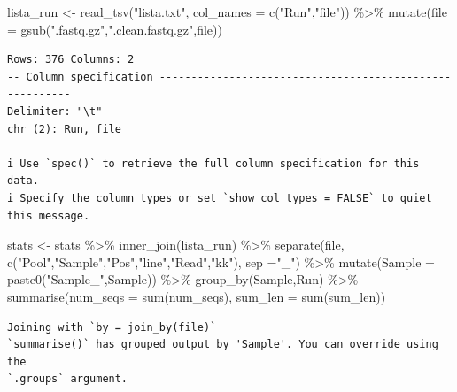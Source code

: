 \documentclass[
  letterpaper,
  DIV=11,
  numbers=noendperiod]{scrartcl}
\newenvironment{Shaded}{\begin{snugshade}}{\end{snugshade}}
\newcommand{\AttributeTok}[1]{\textcolor[rgb]{0.40,0.45,0.13}{#1}}
\newcommand{\FunctionTok}[1]{\textcolor[rgb]{0.28,0.35,0.67}{#1}}
\newcommand{\NormalTok}[1]{\textcolor[rgb]{0.00,0.23,0.31}{#1}}
\newcommand{\OtherTok}[1]{\textcolor[rgb]{0.00,0.23,0.31}{#1}}
\newcommand{\SpecialCharTok}[1]{\textcolor[rgb]{0.37,0.37,0.37}{#1}}
\newcommand{\StringTok}[1]{\textcolor[rgb]{0.13,0.47,0.30}{#1}}
\begin{document}
\begin{Shaded}
\begin{Highlighting}[]
\NormalTok{lista\_run }\OtherTok{\textless{}{-}} \FunctionTok{read\_tsv}\NormalTok{(}\StringTok{"lista.txt"}\NormalTok{, }\AttributeTok{col\_names =} \FunctionTok{c}\NormalTok{(}\StringTok{"Run"}\NormalTok{,}\StringTok{"file"}\NormalTok{)) }\SpecialCharTok{\%\textgreater{}\%} 
  \FunctionTok{mutate}\NormalTok{(}\AttributeTok{file =} \FunctionTok{gsub}\NormalTok{(}\StringTok{".fastq.gz"}\NormalTok{,}\StringTok{".clean.fastq.gz"}\NormalTok{,file))}
\end{Highlighting}
\end{Shaded}

\begin{verbatim}
Rows: 376 Columns: 2
-- Column specification --------------------------------------------------------
Delimiter: "\t"
chr (2): Run, file

i Use `spec()` to retrieve the full column specification for this data.
i Specify the column types or set `show_col_types = FALSE` to quiet this message.
\end{verbatim}

\begin{Shaded}
\begin{Highlighting}[]
\NormalTok{stats }\OtherTok{\textless{}{-}}\NormalTok{ stats }\SpecialCharTok{\%\textgreater{}\%} \FunctionTok{inner\_join}\NormalTok{(lista\_run) }\SpecialCharTok{\%\textgreater{}\%} 
  \FunctionTok{separate}\NormalTok{(file, }\FunctionTok{c}\NormalTok{(}\StringTok{"Pool"}\NormalTok{,}\StringTok{"Sample"}\NormalTok{,}\StringTok{"Pos"}\NormalTok{,}\StringTok{"line"}\NormalTok{,}\StringTok{"Read"}\NormalTok{,}\StringTok{"kk"}\NormalTok{), }\AttributeTok{sep =}\StringTok{"\_"}\NormalTok{) }\SpecialCharTok{\%\textgreater{}\%} 
  \FunctionTok{mutate}\NormalTok{(}\AttributeTok{Sample =} \FunctionTok{paste0}\NormalTok{(}\StringTok{"Sample\_"}\NormalTok{,Sample)) }\SpecialCharTok{\%\textgreater{}\%} 
  \FunctionTok{group\_by}\NormalTok{(Sample,Run) }\SpecialCharTok{\%\textgreater{}\%} \FunctionTok{summarise}\NormalTok{(}\AttributeTok{num\_seqs =} \FunctionTok{sum}\NormalTok{(num\_seqs), }\AttributeTok{sum\_len =} \FunctionTok{sum}\NormalTok{(sum\_len))}
\end{Highlighting}
\end{Shaded}

\begin{verbatim}
Joining with `by = join_by(file)`
`summarise()` has grouped output by 'Sample'. You can override using the
`.groups` argument.
\end{verbatim}
\end{document}
